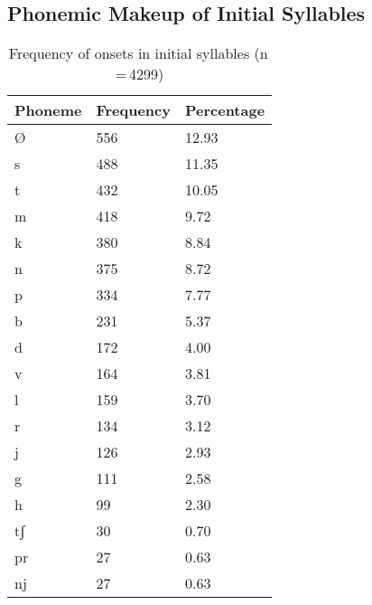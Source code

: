 \subsection{Phonemic Makeup of Initial Syllables}

\begin{table}[pth]\centering
\caption[Frequency of onsets in initial syllables]{Frequency of onsets in initial syllables (n\,=\,4299)}
\begin{tabu} to 0.5\textwidth{X X[c] X[c]}
\tableheaderfont\toprule
Phoneme
	& Frequency
	& Percentage
	\\
	
\toprule

Ø
	& 556
	& 12.93\pct
	\\

\midrule

s
	& 488
	& 11.35\pct
	\\

t
	& 432
	& 10.05\pct
	\\

m
	& 418
	& 9.72\pct
	\\

k
	& 380
	& 8.84\pct
	\\

n
	& 375
	& 8.72\pct
	\\

p
	& 334
	& 7.77\pct
	\\

b
	& 231
	& 5.37\pct
	\\

d
	& 172
	& 4.00\pct
	\\

v
	& 164
	& 3.81\pct
	\\

l
	& 159
	& 3.70\pct
	\\

r
	& 134
	& 3.12\pct
	\\

j
	& 126
	& 2.93\pct
	\\

g
	& 111
	& 2.58\pct
	\\

h
	& 99
	& 2.30\pct
	\\

tʃ
	& 30
	& 0.70\pct
	\\

pr
	& 27
	& 0.63\pct
	\\

nj
	& 27
	& 0.63\pct
	\\


\end{tabu}
\end{table}
